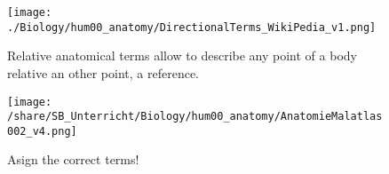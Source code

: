 		
			  \begin{figure}[htbp]
			    \begin{minipage}{0.35\textwidth}
			     \centering
			      \texttt{[image: ./Biology/hum00\_anatomy/DirectionalTerms\_WikiPedia\_v1.png]}
			      \caption{Relative anatomical terms allow to describe any point of a body relative an other point, a reference.}  \label{fig:AnatomicalTerms}
			    \end{minipage}\hspace{0.2cm}
			    \begin{minipage}{0.7\textwidth}
			     \centering
			      \texttt{[image: /share/SB\_Unterricht/Biology/hum00\_anatomy/AnatomieMalatlas002\_v4.png]}
			      \caption{Asign the correct terms!}  \label{fig:AnatTermsApplication}
			    \end{minipage}
 				 \end{figure}
		

\areaset[0cm]{11.5cm}{26.5cm}


